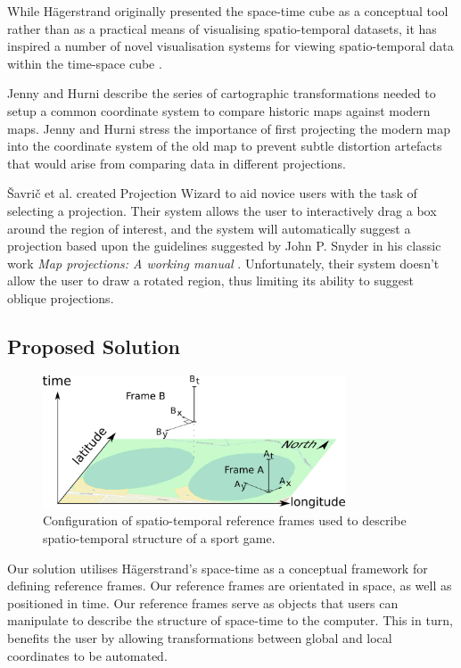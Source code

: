 While H\"{a}gerstrand originally presented the space-time cube as a conceptual tool rather than as a practical means of visualising spatio-temporal datasets, it has inspired a number of novel visualisation systems for viewing spatio-temporal data within the time-space cube \cite{kraak_m._space-time_2003, gatalsky_interactive_2004, andrienko_visualization_2014}.

Jenny and Hurni \cite{jenny_studying_2011} describe the series of cartographic transformations needed to setup a common coordinate system to compare historic maps against modern maps. Jenny and Hurni stress the importance of first projecting the modern map into the coordinate system of the old map to prevent subtle distortion artefacts that would arise from comparing data in different projections.

\v{S}avri\v{c} et al. created Projection Wizard \cite{savric_projection_2016} to aid novice users with the task of selecting a projection. Their system allows the user to interactively drag a box around the region of interest, and the system will automatically suggest a projection based upon the guidelines suggested by John P. Snyder in his classic work \textit{Map projections: A working manual} \cite{snyder_map_1987}. Unfortunately, their system doesn't allow the user to draw a rotated region, thus limiting its ability to suggest oblique projections.

\subsection{Proposed Solution}

\begin{figure}
\includegraphics[width=0.8\textwidth]{figs/paper/space-ref-map-v2-export}
\caption{Configuration of spatio-temporal reference frames used to describe spatio-temporal structure of a sport game.}
\label{fig:space-ref}
\end{figure}

Our solution utilises H\"{a}gerstrand's space-time as a conceptual framework for defining reference frames. Our reference frames are orientated in space, as well as positioned in time. Our reference frames serve as objects that users can manipulate to describe the structure of space-time to the computer. This in turn, benefits the user by allowing transformations between global and local coordinates to be automated.

